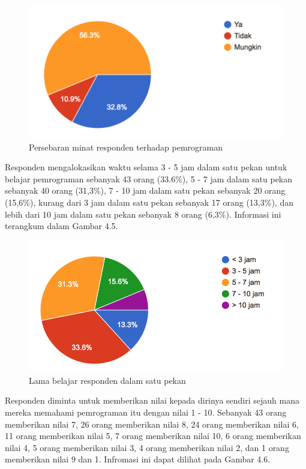 	\begin{figure}
		\includegraphics[width=\linewidth]{pics/passion-pemograman}
		\caption{Persebaran minat responden terhadap pemrograman}
		\centering
	\end{figure}
	Responden mengalokasikan waktu selama 3 - 5 jam dalam satu pekan untuk belajar pemrograman sebanyak 43 orang (33.6\%), 5 - 7 jam dalam satu pekan sebanyak 40 orang (31,3\%),  7 - 10 jam dalam satu pekan sebanyak 20 orang (15,6\%), kurang dari 3 jam dalam satu pekan sebanyak 17 orang (13,3\%), dan lebih dari 10 jam dalam satu pekan sebanyak 8 orang (6,3\%). Informasi ini terangkum dalam Gambar 4.5.
	\begin{figure}
		\includegraphics[width=\linewidth]{pics/lama-belajar}
		\caption{Lama belajar responden dalam satu pekan}
		\centering
	\end{figure}
	Responden diminta untuk memberikan nilai kepada dirinya sendiri sejauh mana mereka memahami pemrograman itu dengan nilai 1 - 10. Sebanyak 43 orang memberikan nilai 7, 26 orang memberikan nilai 8, 24 orang memberikan nilai 6, 11 orang memberikan nilai 5, 7 orang memberikan nilai 10, 6 orang memberikan nilai 4, 5 orang memberikan nilai 3, 4 orang memberikan nilai 2, dan 1 orang memberikan nilai 9 dan 1. Infromasi ini dapat dilihat pada Gambar 4.6.

